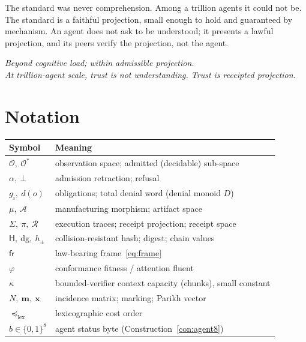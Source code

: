 \documentclass[11pt,oneside]{book}
\theoremstyle{definition}
\theoremstyle{plain}
\theoremstyle{remark}
\newcommand{\Obs}{\mathcal{O}}                 %
\newcommand{\Adm}{\mathcal{O}^{*}}             %
\newcommand{\Act}{\mathcal{A}}                 %
\newcommand{\Recs}{\mathcal{R}}                %
\newcommand{\Proj}{\pi}                        %
\newcommand{\muop}{\mu}                        %
\newcommand{\adm}{\alpha}                      %
\newcommand{\chainH}{\mathsf{H}}               %
\newcommand{\Rfsl}{\bot}                       %
\newcommand{\CL}{\kappa}                       %
\newcommand{\Fitness}{\varphi}
\newcommand{\dg}{\mathrm{dg}}                  %
\begin{document}
The standard was never comprehension. Among a trillion agents it could not be. The standard is a
faithful projection, small enough to hold and guaranteed by mechanism. An agent does not ask to
be understood; it presents a lawful projection, and its peers verify the projection, not the
agent.

\begin{center}\itshape
Beyond cognitive load; within admissible projection.\\[0.3em]
At trillion-agent scale, trust is not understanding. Trust is receipted projection.
\end{center}

\appendix
\chapter{Notation}
\begin{tabular}{ll}
\toprule
Symbol & Meaning\\
\midrule
$\Obs,\ \Adm$ & observation space; admitted (decidable) sub-space\\
$\adm,\ \Rfsl$ & admission retraction; refusal\\
$g_i,\ d(o)$ & obligations; total denial word (denial monoid $D$)\\
$\muop,\ \Act$ & manufacturing morphism; artifact space\\
$\Sigma,\ \Proj,\ \Recs$ & execution traces; receipt projection; receipt space\\
$\chainH,\ \dg,\ h_\pm$ & collision-resistant hash; digest; chain values\\
$\mathsf{fr}$ & law-bearing frame~\eqref{eq:frame}\\
$\Fitness$ & conformance fitness / attention fluent\\
$\CL$ & bounded-verifier context capacity (chunks), small constant\\
$N,\ \bm m,\ \bm x$ & incidence matrix; marking; Parikh vector\\
$\preceq_{\mathrm{lex}}$ & lexicographic cost order\\
$b\in\{0,1\}^8$ & agent status byte (Construction~\ref{con:agent8})\\
\bottomrule
\end{tabular}
\end{document}
